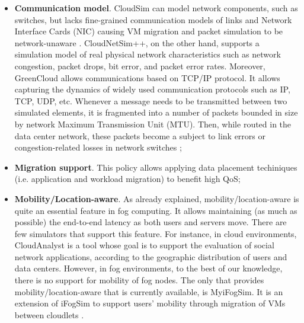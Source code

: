 \begin{itemize}[noitemsep]
\item \textbf{Communication model}. CloudSim can model network components, such as switches, but lacks fine-grained communication models of links and Network Interface Cards (NIC) causing VM migration and packet simulation to be network-unaware \cite{malik2017cloudnetsim++}. CloudNetSim++, on the other hand, supports a simulation model of real physical network characteristics such as network congestion, packet drops, bit error, and packet error rates. Moreover, GreenCloud allows communications based on TCP/IP protocol. It allows capturing the dynamics of widely used communication protocols such as IP, TCP, UDP, etc. Whenever a message needs to be transmitted between two simulated elements, it is fragmented into a number of packets bounded in size by network Maximum Transmission Unit (MTU). Then, while routed in the data center network, these packets become a subject to link errors or congestion-related losses in network switches \cite{kliazovich2012greencloud};
\item \textbf{Migration support}. This policy allows applying data placement techiniques (i.e. application and workload migration) to benefit high QoS;
\item \textbf{Mobility/Location-aware}. As already explained, mobility/location-aware is quite an essential feature in fog computing. It allows maintaining (as much as possible) the end-to-end latency as both users and servers move. There are few simulators that support this feature. For instance, in cloud environments, CloudAnalyst \cite{wickremasinghe2010cloudanalyst} is a tool whose goal is to support the evaluation of social network applications, according to the geographic distribution of users and data centers. However, in fog environments, to the best of our knowledge, there is no support for mobility of fog nodes. The only that provides mobility/location-aware that is currently available, is MyiFogSim. It is an extension of iFogSim to support users' mobility through migration of VMs between cloudlets \cite{lopes2017myifogsim}.
\end{itemize}